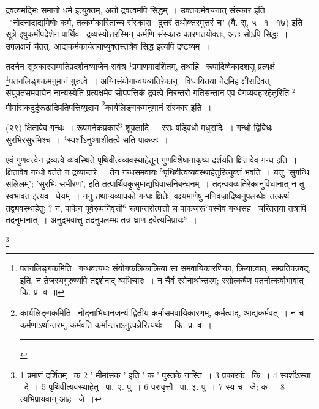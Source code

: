 \documentclass[11pt, openany]{book}
\newcommand\blfootnote[1]{%
 \begingroup
 \renewcommand\thefootnote{}\footnote{#1}%
 \addtocounter{footnote}{-1}%
 \endgroup
}
\begin{document}
\newpage
\noindent
द्रवत्वमद्भिः समानो धर्म इत्युक्तम्, अतो द्रवत्वमपि सिद्धम्~। {\knu उक्तकर्मवचनात् संस्कार इति \textendash\ "नोदनादाद्यमिषोः कर्म, तत्कर्मकारिताच्च संस्कारा \textendash\ दुत्तरं तथोक्तरमुत्तरं च"} (वै. सू. ५ \textendash\ १ \textendash\ १७) इति सूत्रे इषुकर्मोपदेशेन पार्थिव \textendash\ द्रव्यस्योत्तरस्मिन् कर्मणि संस्कारः कारणतयोक्तः, अतः सोऽपि सिद्धः~। उपलक्षणं चैतत्, आद्यकर्मकार्यतयाप्युक्तस्तत्रैव सिद्ध इत्यपि द्रष्टव्यम्~।

\begin{sloppypar}
तदनेन सूत्रकारसम्मतिप्रदर्शनव्याजेन सर्वत्र ${}^1$प्रमाणमादर्शितम्, तथाहि \textendash\ रूपादिष्वेकादशसु प्रत्यक्षं \renewcommand{\thefootnote}{१}\footnote{पतनलिङ्गकमिति \textendash\ गन्धवत्यधः संयोगफलिकाक्रिया सा समवायिकारणिका, क्रियात्वात्, सम्प्रतिपन्नवद्, इति, न तेजस्यगुरुण्यपि तद्दर्शनाद् व्यभिचारः~। न चैवं रसेनार्थान्तरम्; रसोत्कर्षेण पतनोत्कर्षाभावात्~। कि. प्र. व~॥}पतनलिङ्गकमनुमानं गुरुत्वे~। अग्निसंयोगान्वयव्यतिरेकानु \textendash\ विधायितया नेदमिह क्षीरादिवत् संयुक्तसमवायेन नान्यस्येति प्रत्यक्षमेव सोपपत्तिकं द्रवत्वे निरन्तरो गतिसन्तान एव वेगव्यवहारहेतुरिति ${}^2${\knu मीमांस}कदुर्दुरूढादिप्रतिपत्तिव्युदाय \renewcommand{\thefootnote}{२}\footnote{कार्यलिङ्गकमिति \textendash\ नोदनाभिधानजन्यं द्वितीयं कर्मासमवायिकारणम्, कर्मत्वाद्, आद्यकर्मवत्~। न च कर्मणाऽर्थान्तरम्, कर्मवति कर्मान्तराऽनुत्पन्नेरित्यर्थः~। कि. प्र. व~।\\ \rule{0.4\linewidth}{0.5pt}}कार्यलिङ्गकमनुमानं संस्कार इति~।
\end{sloppypar}

\hangindent=2cm {\knu (२९) क्षितावेव गन्धः~। रूपमनेकप्रकारं$^3$ शुक्लादि~। रसः षड्विधो मधुरादिः~। गन्धो द्विविधः सुरभिरसुरभिश्च~। ${}^4$स्पर्शोऽनुष्णाशीतत्वे सति पाकजः~।}

एवं गुणवत्त्वेन द्रव्यत्वे व्यवस्थिते पृथिवीत्वव्यवस्थाहेतून् गुणविशेषानाकृष्य दर्शयति क्षितावेव गन्ध इति~। {\knu क्षितावेव गन्धो} वर्तते न द्रव्यान्तरे~। तेन गन्धसमवायः ${}^5$पृथिवीत्वव्यवस्थाहेतुरित्युक्तं भवति~। यत्तु 'सुगन्धि सलिलम्'; 'सुरभिः सभीरण', इति तत्पार्थिवकुसुमाद्यधिवासनिबन्धनम्~। तदन्वयव्यतिरेकानुविधानात् न तु स्वभावत इत्यव \textendash\ धेयम्~। ननु तथाप्यव्यापको गन्धः क्षितेः, वक्ष्यमाणेषु मणिवज्रादिष्वनुपलब्धेः; तत्कथं तद्व्यवस्थाहेतुः ? न, पाकेन पूर्वरूपनिवृत्तौ$^6$ रूपान्तरोत्पत्तौ च पाकजरू$^7$पस्यैव गन्धसह \textendash\ चरिततया तत्रापि तदनुमानात्~। अनुद्भवात्तु तदनुपलम्भः तत्र घ्राण इवेत्यभिप्रायः$^8$~।

\blfootnote{1 प्रमाणं दर्शितम् \textendash\ क 2 ' मीमांसक ' इति ' क ' पुस्तके नास्ति~। 3 प्रकारकं  \textendash\ कि~। 4 स्पर्शोऽस्या  \textendash\ दे~। 5 पृथिवीत्यवस्थाहेतु  \textendash\ पा. २. पु~। 6 परावृत्तौ  \textendash\ पा. ३. पु~। 7 स्य च  \textendash\ जे; क~। 8 त्यभिप्रायवान् आह  \textendash\ जे~।}
\end{document}
